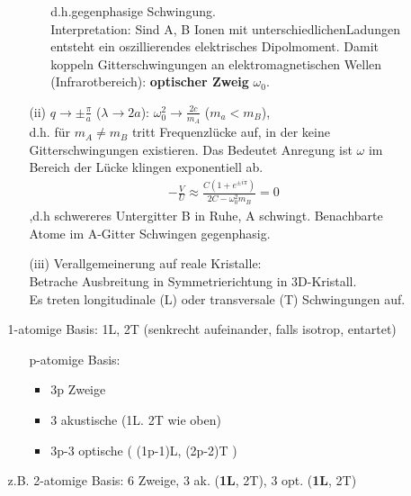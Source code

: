 \begin{itemize}
\begin{itemize}
\begin{itemize}
\begin{itemize}
				d.h.gegenphasige Schwingung.\\
				Interpretation: Sind A, B Ionen mit unterschiedlichenLadungen entsteht ein oszillierendes elektrisches Dipolmoment. Damit koppeln Gitterschwingungen an elektromagnetischen Wellen (Infrarotbereich): \textbf{optischer Zweig} $\omega_0$.
			\end{itemize}
			\item[(ii)]  $q \rightarrow \pm \frac{\pi}{a}$ ($\lambda \rightarrow 2a$): $\omega_0^2 \rightarrow \frac{2c}{m_A}$ ($m_a < m_B$),\\
			d.h. für $m_A \neq m_B$ tritt Frequenzlücke auf, in der keine Gitterschwingungen existieren. Das Bedeutet Anregung ist $\omega$ im Bereich der Lücke klingen exponentiell ab.
			\begin{align*}
				-\frac{V}{U}\approx \frac{C(1+e^{\pm i\pi})}{2C-\omega_0^2m_B} = 0
			\end{align*}
			,d.h schwereres Untergitter B in Ruhe, A schwingt. Benachbarte Atome im A-Gitter Schwingen gegenphasig.
			\item[(iii)] Verallgemeinerung auf reale Kristalle:\\
			Betrache Ausbreitung in Symmetrierichtung in 3D-Kristall.\\
			Es treten longitudinale (L) oder transversale (T) Schwingungen auf.
		\end{itemize} 
		1-atomige Basis: 1L, 2T (senkrecht aufeinander, falls isotrop, entartet)\\
		\begin{itemize}
			\item[p-atomige Basis:]
			\begin{itemize}
				\item 3p Zweige
				\item 3 akustische (1L. 2T wie oben)
				\item 3p-3 optische ( (1p-1)L,  (2p-2)T )
			\end{itemize} 
		\end{itemize}
		z.B. 2-atomige Basis: 6 Zweige, 3 ak. (\textbf{1L}, 2T), 3 opt. (\textbf{1L}, 2T)
	\end{itemize}
\end{itemize}




